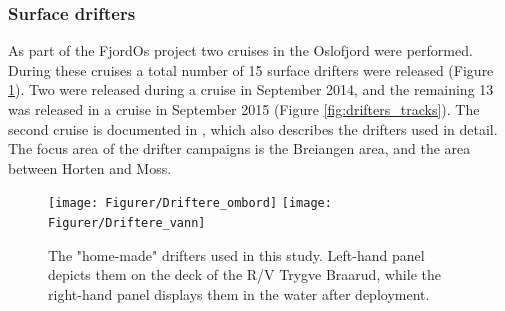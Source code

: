 

\newpage
\subsubsection{Surface drifters}
As part of the FjordOs project two cruises in the Oslofjord were performed. During these cruises a total number of 15 surface drifters were released (Figure \ref{fig:drifters_design}). Two were released during a cruise in September 2014, and the remaining 13 was released in a cruise in September 2015 (Figure \ref{fig:drifters_tracks}). The second cruise is documented in \cite{hjelm:etal:2016}, which also describes the drifters used in detail. The focus area of the drifter campaigns is the Breiangen area, and the area between Horten and Moss.

\begin{figure}[ht]
\centerline{
\texttt{[image: Figurer/Driftere\_ombord]}
\texttt{[image: Figurer/Driftere\_vann]}
}
\caption{\small
The "home-made" drifters used in this study. Left-hand panel depicts them on the deck of the R/V Trygve Braarud, while the right-hand panel displays them in the water after deployment.}
\label{fig:drifters_design}
\end{figure}

